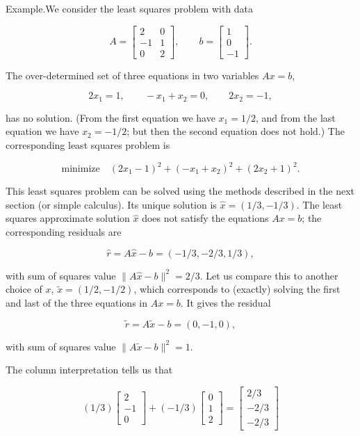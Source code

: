 Example.We consider the least squares problem with data

\[A=\left[\begin{array}{cc}2&0\\ -1&1\\ 0&2\end{array}\right],\qquad b=\left[\begin{array}{c}1\\ 0\\ -1\end{array}\right].\]

The over-determined set of three equations in two variables \(Ax=b\),

\[2x_{1}=1,\qquad-x_{1}+x_{2}=0,\qquad 2x_{2}=-1,\]

has no solution. (From the first equation we have \(x_{1}=1/2\), and from the last equation we have \(x_{2}=-1/2\); but then the second equation does not hold.) The corresponding least squares problem is

\[\mbox{minimize}\quad(2x_{1}-1)^{2}+(-x_{1}+x_{2})^{2}+(2x_{2}+1)^{2}.\]

This least squares problem can be solved using the methods described in the next section (or simple calculus). Its unique solution is \(\hat{x}=(1/3,-1/3)\). The least squares approximate solution \(\hat{x}\) does not satisfy the equations \(Ax=b\); the corresponding residuals are

\[\hat{r}=A\hat{x}-b=(-1/3,-2/3,1/3),\]

with sum of squares value \(\|A\hat{x}-b\|^{2}=2/3\). Let us compare this to another choice of \(x\), \(\tilde{x}=(1/2,-1/2)\), which corresponds to (exactly) solving the first and last of the three equations in \(Ax=b\). It gives the residual

\[\tilde{r}=A\tilde{x}-b=(0,-1,0),\]

with sum of squares value \(\|A\tilde{x}-b\|^{2}=1\).

The column interpretation tells us that

\[(1/3)\left[\begin{array}{c}2\\ -1\\ 0\end{array}\right]+(-1/3)\left[\begin{array}{c}0\\ 1\\ 2\end{array}\right]=\left[\begin{array}{c}2/3\\ -2/3\\ -2/3\end{array}\right]\]

